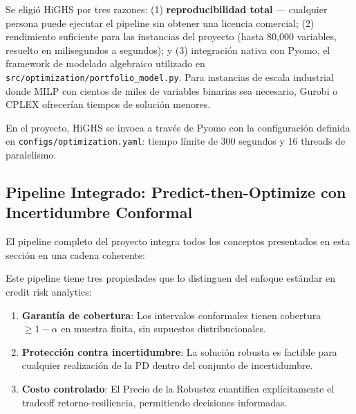 \documentclass[
  spanish,
  11pt,
  letterpaper,
]{scrbook}
\providecommand{\tightlist}{%
  \setlength{\itemsep}{0pt}\setlength{\parskip}{0pt}}
\theoremstyle{plain}
\theoremstyle{remark}
\begin{document}
\begin{tcolorbox}[enhanced jigsaw, arc=.35mm, bottomrule=.15mm, bottomtitle=1mm, breakable, colback=white, colbacktitle=quarto-callout-note-color!10!white, colframe=quarto-callout-note-color-frame, coltitle=black, left=2mm, leftrule=.75mm, opacityback=0, opacitybacktitle=0.6, rightrule=.15mm, title=\textcolor{quarto-callout-note-color}{\faInfo}\hspace{0.5em}{Decisión de diseño}, titlerule=0mm, toprule=.15mm, toptitle=1mm]

Se eligió HiGHS por tres razones: (1) \textbf{reproducibilidad total}
--- cualquier persona puede ejecutar el pipeline sin obtener una
licencia comercial; (2) rendimiento suficiente para las instancias del
proyecto (hasta 80,000 variables, resuelto en milisegundos a segundos);
y (3) integración nativa con Pyomo, el framework de modelado algebraico
utilizado en \texttt{src/optimization/portfolio\_model.py}. Para
instancias de escala industrial donde MILP con cientos de miles de
variables binarias sea necesario, Gurobi o CPLEX ofrecerían tiempos de
solución menores.

\end{tcolorbox}

En el proyecto, HiGHS se invoca a través de Pyomo con la configuración
definida en \texttt{configs/optimization.yaml}: tiempo límite de 300
segundos y 16 threads de paralelismo.

\subsection{Pipeline Integrado: Predict-then-Optimize con Incertidumbre
Conformal}\label{sec-integrated-pipeline}

El pipeline completo del proyecto integra todos los conceptos
presentados en esta sección en una cadena coherente:

Este pipeline tiene tres propiedades que lo distinguen del enfoque
estándar en credit risk analytics:

\begin{enumerate}
\def\labelenumi{\arabic{enumi}.}
\tightlist
\item
  \textbf{Garantía de cobertura}: Los intervalos conformales tienen
  cobertura \(\geq 1 - \alpha\) en muestra finita, sin supuestos
  distribucionales.
\item
  \textbf{Protección contra incertidumbre}: La solución robusta es
  factible para cualquier realización de la PD dentro del conjunto de
  incertidumbre.
\item
  \textbf{Costo controlado}: El Precio de la Robustez cuantifica
  explícitamente el tradeoff retorno-resiliencia, permitiendo decisiones
  informadas.
\end{enumerate}
\end{document}
